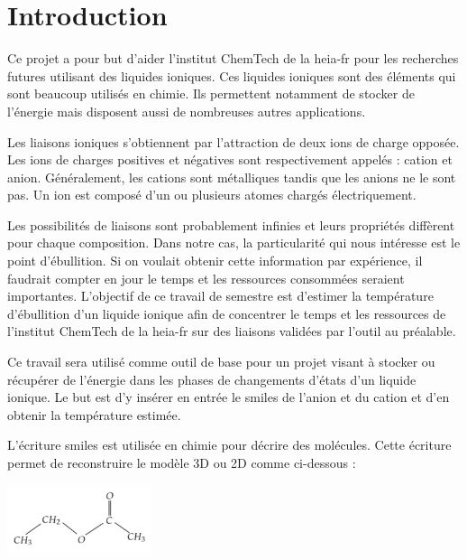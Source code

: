 \chapter{Introduction}
\label{chap:introduction}

Ce projet a pour but d'aider l'institut ChemTech de la \acrshort{heia-fr} pour les recherches futures utilisant des liquides ioniques.
Ces liquides ioniques sont des éléments qui sont beaucoup utilisés en chimie.
Ils permettent notamment de stocker de l'énergie mais disposent aussi de nombreuses autres applications.

Les liaisons ioniques s'obtiennent par l'attraction de deux ions de charge opposée.
Les ions de charges positives et négatives sont respectivement appelés : cation et anion.
Généralement, les cations sont métalliques tandis que les anions ne le sont pas.
Un ion est composé d'un ou plusieurs atomes chargés électriquement.

Les possibilités de liaisons sont probablement infinies et leurs propriétés diffèrent pour chaque composition.
Dans notre cas, la particularité qui nous intéresse est le point d'ébullition.
Si on voulait obtenir cette information par expérience, il faudrait compter en jour le temps et les ressources consommées seraient importantes.
L'objectif de ce travail de semestre est d'estimer la température d'ébullition d'un liquide ionique afin de concentrer le temps et les ressources de l'institut ChemTech de la \acrshort{heia-fr} sur des liaisons validées par l'outil au préalable.

Ce travail sera utilisé comme outil de base pour un projet visant à stocker ou récupérer de l'énergie dans les phases de changements d'états d'un liquide ionique.
Le but est d'y insérer en entrée le \acrfull{smiles} de l'anion et du cation et d'en obtenir la température estimée.

L'écriture \acrshort{smiles} est utilisée en chimie pour décrire des molécules.
Cette écriture permet de reconstruire le modèle 3D ou 2D comme ci-dessous :
\begin{center}
   \includegraphics[height=20mm]{img/smiles_example.png}
\end{center}

